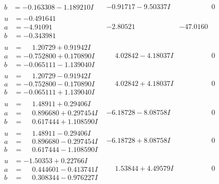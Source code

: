 \documentclass[1p]{elsarticle_modified}
\theoremstyle{definition}
\begin{document}
$$\begin{array}{c|c|c}
\begin{aligned}
b &= -0.163308 - 1.189210 I\end{aligned}
 & -0.91717 - 9.50337 I & \phantom{-0.000000 } 0 \\ \hline\begin{aligned}
u &= -0.491641\phantom{ +0.000000I} \\
a &= -4.91091\phantom{ +0.000000I} \\
b &= -0.343981\phantom{ +0.000000I}\end{aligned}
 & -2.80521\phantom{ +0.000000I} & -47.0160\phantom{ +0.000000I} \\ \hline\begin{aligned}
u &= \phantom{-}1.20729 + 0.91942 I \\
a &= -0.752800 + 0.170890 I \\
b &= -0.065111 - 1.139040 I\end{aligned}
 & \phantom{-}4.02842 - 4.18037 I & \phantom{-0.000000 } 0 \\ \hline\begin{aligned}
u &= \phantom{-}1.20729 - 0.91942 I \\
a &= -0.752800 - 0.170890 I \\
b &= -0.065111 + 1.139040 I\end{aligned}
 & \phantom{-}4.02842 + 4.18037 I & \phantom{-0.000000 } 0 \\ \hline\begin{aligned}
u &= \phantom{-}1.48911 + 0.29406 I \\
a &= \phantom{-}0.896680 + 0.297454 I \\
b &= \phantom{-}0.617444 + 1.108590 I\end{aligned}
 & -6.18728 - 8.08758 I & \phantom{-0.000000 } 0 \\ \hline\begin{aligned}
u &= \phantom{-}1.48911 - 0.29406 I \\
a &= \phantom{-}0.896680 - 0.297454 I \\
b &= \phantom{-}0.617444 - 1.108590 I\end{aligned}
 & -6.18728 + 8.08758 I & \phantom{-0.000000 } 0 \\ \hline\begin{aligned}
u &= -1.50353 + 0.22766 I \\
a &= \phantom{-}0.444601 - 0.413741 I \\
b &= \phantom{-}0.308344 - 0.976227 I\end{aligned}
 & \phantom{-}1.53844 + 4.49579 I & \phantom{-0.000000 } 0 \\ \hline\begin{aligned}

\end{aligned}
\end{array}$$
\end{document}
